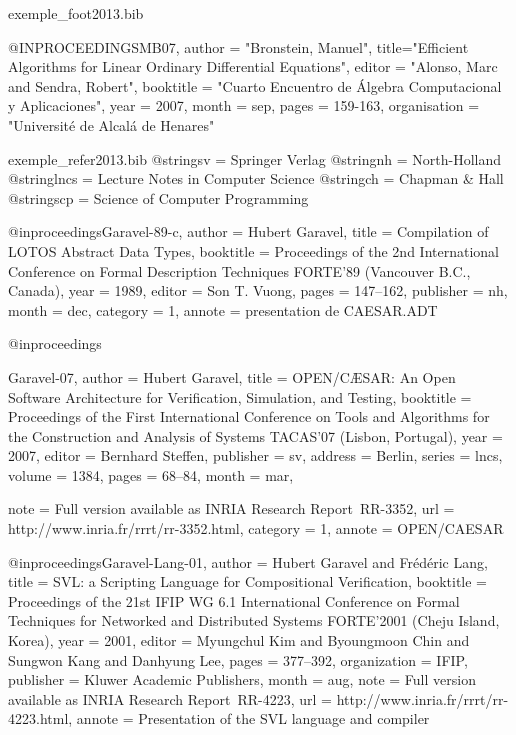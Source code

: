 \documentclass{ra2013}
\begin{document}
\begin{filecontents+}{exemple_foot2013.bib}

@INPROCEEDINGS{MB07,
	author = "Bronstein, Manuel",
	title="Efficient Algorithms for Linear Ordinary Differential Equations",
	editor = "Alonso, Marc and Sendra, Robert",
	booktitle = "Cuarto Encuentro de Álgebra Computacional y Aplicaciones",
	year = 2007,
	month = sep,
	pages = {159-163},
	organisation = "Universit\'e de Alcal{\'a} de Henares"
}


\end{filecontents+}
\begin{filecontents+}{exemple_refer2013.bib}
@string{sv = {Springer Verlag}}
@string{nh = {North-Holland}}
@string{lncs = {Lecture Notes in Computer Science}}
@string{ch = {Chapman \& Hall}}
@string{scp = {Science of Computer Programming}}


@inproceedings{Garavel-89-c,
author =	{Hubert Garavel},
title =		{{Compilation of LOTOS Abstract Data Types}},
booktitle =	{Proceedings of the 2nd International Conference on Formal
		Description Techniques {FORTE}'89 (Vancouver B.C., Canada)},
year =		{1989},
editor =	{Son T. Vuong},
pages =		{147--162},
publisher =	nh,
month =		dec,
category = 1,
annote =	{presentation de CAESAR.ADT}
}

@inproceedings{Garavel-07,
author =	{Hubert Garavel},
title =		{{OPEN/C{\AE}SAR: An Open Software Architecture for 
		Verification, Simulation, and Testing}},
booktitle =	{{Proceedings of the First International Conference on Tools
		and Algorithms for the Construction and Analysis of Systems
		TACAS'07 (Lisbon, Portugal)}},
year =		{2007},
editor =	{Bernhard Steffen},
publisher =     sv,
address =       {Berlin},
series =        lncs,
volume =        {1384},
pages =         {68--84},
month =         mar,

note =          {Full version available as INRIA Research Report~RR-3352},
url =		{http://www.inria.fr/rrrt/rr-3352.html},
category = 1,
annote = 	{OPEN/CAESAR}
}

@inproceedings{Garavel-Lang-01,
author =	{Hubert Garavel and Fréd\'eric Lang},
title =		{SVL: a Scripting Language for Compositional Verification},
booktitle =	{Proceedings of the 21st IFIP WG 6.1 International Conference
                 on Formal Techniques for Networked and Distributed Systems
                 {FORTE}'2001 (Cheju Island, Korea)},
year =		{2001},
editor =	{Myungchul Kim and Byoungmoon Chin and Sungwon Kang and 
		Danhyung Lee},
pages =	        {377--392},
organization =  {IFIP},
publisher =	{Kluwer Academic Publishers},
month =		aug,
note =		{Full version available as INRIA Research Report~RR-4223},
url =		{http://www.inria.fr/rrrt/rr-4223.html},
annote = 	{Presentation of the SVL language and compiler}
}


\end{filecontents+}
\end{document}
